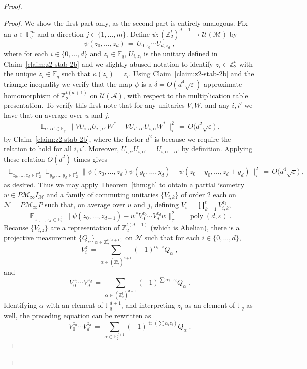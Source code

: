 \documentclass[11pt]{article}
\theoremstyle{definition}
\newcommand{\Id}{\ensuremath{I}}
\DeclareMathOperator*{\Expectation}{\mathbb{E}}
\newcommand{\Es}[1]{\Expectation_{#1}}
\newcommand{\F}{\ensuremath{\mathbb{F}}}
\newcommand{\Z}{\ensuremath{\mathbb{Z}}}
\newcommand{\mA}{\ensuremath{\mathcal{A}}}
\newcommand{\mM}{\ensuremath{\mathcal{M}}}
\newcommand{\mU}{\ensuremath{\mathcal{U}}}
\DeclareMathOperator{\poly}{poly}
\newcommand{\eps}{\varepsilon}
\newcommand{\mN}{\mathcal{N}}
\DeclareMathOperator{\tr}{tr}
\begin{document}
\begin{proof}
\begin{proof}
We show the first part only, as the second part is entirely analogous. Fix an $u\in \F_q^m$ and a direction $j\in \{1,\ldots,m\}$. Define
$\psi: (\Z_2^{t})^{d+1} \to \mU(\mM)$ by 
\[\psi(z_0,\ldots,z_{d}) \,=\, U_{0,z_0} \cdots U_{d,z_{d}}\;,\]
where for each $i\in\{0,\ldots,d\}$ and $z_i\in \F_q$, $U_{i,z_i}$ is the unitary defined in Claim~\ref{claim:z2-stab-2b} and we slightly abused notation to identify $z_i\in \Z_2^t$ with the unique $\tilde{z}_i\in \F_q$ such that $\kappa(\tilde{z}_i)=z_i$. Using Claim~\ref{claim:z2-stab-2b} and the triangle inequality we verify that the map $\psi$ is a $\delta=O(d^4\sqrt{\eps})$-approximate homomorphism of $\Z_2^{t(d+1)}$ on $\mU(\mA)$, with respect to the multiplication table presentation. To verify this first note that for any unitaries $V,W$, and any $i,i'$ we have that on average over $u$ and $j$,
\begin{align*}
\Es{\alpha,\alpha'\in \F_q} \big\| V U_{i,\alpha} U_{i',\alpha'} W^* - V U_{i',\alpha'} U_{i,\alpha}  W^*\big\|_\tau^2 \,=\, O\big(d^2 \sqrt{\eps}\big)\;,
\end{align*}
by Claim~\ref{claim:z2-stab-2b}, where the factor $d^2$ is because we require the relation to hold for all $i,i'$. Moreover, $U_{i,\alpha}U_{i,\alpha'}=U_{i,\alpha+\alpha'}$ by definition. Applying these relation $O(d^2)$ times gives
\begin{align*}
 \Es{z_0,\ldots,z_d\in\F_2^t}\Es{y_0,\ldots,y_d\in\F_2^t}\big\|\psi(z_0,\ldots,z_d)\psi(y_0,\ldots,y_d) -\psi(z_0+y_0,\ldots,z_d+y_d)\big\|_\tau^2 \,=\, O\big(d^4 \sqrt{\eps}\big)\;,
\end{align*}
as desired.
Thus we may apply Theorem~\ref{thm:gh} to obtain a partial isometry $w\in P\mM_\infty\Id_\mM$ and a family of commuting unitaries $\{V_{i,k}\}$ of order $2$ each on $\mN=P\mM_\infty P$ such that, on average over $u$ and $j$, defining $V_i^z = \prod_{k=1}^t V_{i,k}^{z_k}$,
\begin{equation}\label{eq:z2-stab-3-1}
\Es{z_0,\ldots,z_{d}\in\F_2^t} \big\| \psi(z_0,\ldots,z_{d+1}) - w^* V_0^{z_0}\cdots V_{d}^{z_{d}} w \big\|_\tau^2 \,=\, \poly(d,\eps)\;.
\end{equation}
Because $\{V_{i,z}\}$ are a representation of $\Z_2^{t(d+1)}$ (which is Abelian), there is a projective measurement $\{Q_\alpha\}_{\alpha\in \Z_2^{t(d+1)}}$ on $\mN$ such that for each $i\in\{0,\ldots,d\}$, 
\[ V_{i}^{z} \,=\, \sum_{\alpha\in (\Z_2^{t})^{d+1}} (-1)^{\alpha_{i}\cdot z} Q_\alpha\;,\]
and  
\[ V_{0}^{z_0}\cdots V_{d}^{z_{d}}  \,=\, \sum_{\alpha\in (\Z_2^{t})^{d+1}} (-1)^{\sum \alpha_{i}\cdot z_i} Q_\alpha\;.\]
Identifying $\alpha$ with an element of $\F_q^{d+1}$, and interpreting $z_i$ as an element of $\F_q$ as well,
 the preceding equation can be rewritten as
\[ V_{0}^{z_0}\cdots V_{d}^{z_{d}}  \,=\, \sum_{\alpha\in \F_q^{d+1}} (-1)^{\tr(\sum \alpha_{i} z_i)} Q_\alpha\;.\]


\end{proof}
\end{proof}
\end{document}
